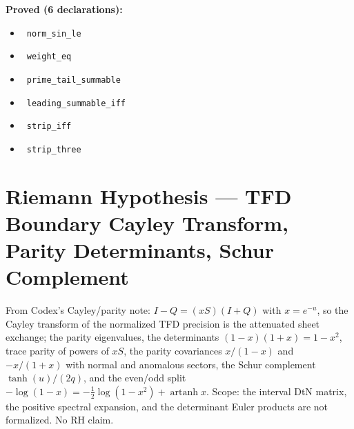 \documentclass{report}
\theoremstyle{definition}
\begin{document}
\noindent\textbf{Proved (6 declarations):}
\begin{itemize}
  \item {}\leanok\ \texttt{norm\_sin\_le}
  \item {}\leanok\ \texttt{weight\_eq}
  \item {}\leanok\ \texttt{prime\_tail\_summable}
  \item {}\leanok\ \texttt{leading\_summable\_iff}
  \item {}\leanok\ \texttt{strip\_iff}
  \item {}\leanok\ \texttt{strip\_three}
\end{itemize}

\section{Riemann Hypothesis --- TFD Boundary Cayley Transform, Parity Determinants, Schur Complement}
From Codex's Cayley/parity note: $I-Q=(xS)(I+Q)$ with $x=e^{-u}$, so the Cayley transform of the normalized TFD precision is the attenuated sheet exchange; the parity eigenvalues, the determinants $(1-x)(1+x)=1-x^2$, trace parity of powers of $xS$, the parity covariances $x/(1-x)$ and $-x/(1+x)$ with normal and anomalous sectors, the Schur complement $\tanh(u)/(2q)$, and the even/odd split $-\log(1-x)=-\tfrac12\log(1-x^2)+\operatorname{artanh}x$. Scope: the interval DtN matrix, the positive spectral expansion, and the determinant Euler products are not formalized. No RH claim.
\end{document}
